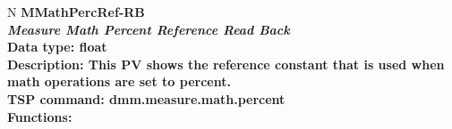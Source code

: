 \documentclass[openany]{article}
\begin{document}
		\begin{tabular}{N}
			\hline
			\bfseries MMathPercRef-RB\label{pv:mmathpercref-rb} \\ \hline
			\emph{Measure Math Percent Reference Read Back} \\
			Data type: float \\
			Description: This PV shows the reference constant that is used when math operations are set to percent. \\
			TSP command: dmm.measure.math.percent \\
			Functions: \\
			\arrayrulecolor{\FuncTableBorderColor}

		\end{tabular}
\end{document}
